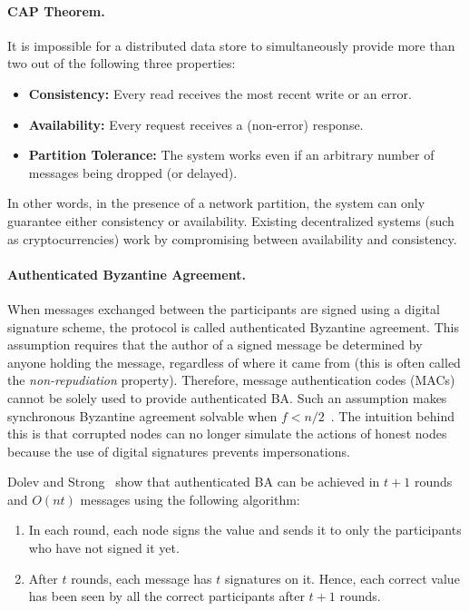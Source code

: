 \documentclass[11pt]{article}
\theoremstyle{mytheoremstyle}
\begin{document}
\paragraph{CAP Theorem.} It is impossible for a distributed data store to simultaneously provide more than two out of the following three properties: 
\begin{itemize}
	\item \textbf{Consistency:} Every read receives the most recent write or an error.
	\item \textbf{Availability:} Every request receives a (non-error) response.
	\item \textbf{Partition Tolerance:} The system works even if an arbitrary number of messages being dropped (or delayed).
\end{itemize}
In other words, in the presence of a network partition, the system can only guarantee either consistency or availability. Existing decentralized systems (such as cryptocurrencies) work by compromising between availability and consistency.

\paragraph{Authenticated Byzantine Agreement.}
When messages exchanged between the participants are signed using a digital signature scheme, the protocol is called authenticated Byzantine agreement. This assumption requires that the author of a signed message be determined by anyone holding the message, regardless of where it came from (this is often called the \emph{non-repudiation} property). Therefore, message authentication codes (MACs) cannot be solely used to provide authenticated BA. Such an assumption makes synchronous Byzantine agreement solvable when $f<n/2$~\cite{srini2017}. The intuition behind this is that corrupted nodes can no longer simulate the actions of honest nodes because the use of digital signatures prevents impersonations.


Dolev and Strong~\cite{Dolev:Strong:83} show that authenticated BA can be achieved in $t+1$ rounds and $O(nt)$ messages using the following algorithm:

\begin{enumerate}
	\item In each round, each node signs the value and sends it to only the participants who have not signed it yet.
	\item After $t$ rounds, each message has $t$ signatures on it. Hence, each correct value has been seen by all the correct participants after $t+1$ rounds.
\end{enumerate}
\end{document}
